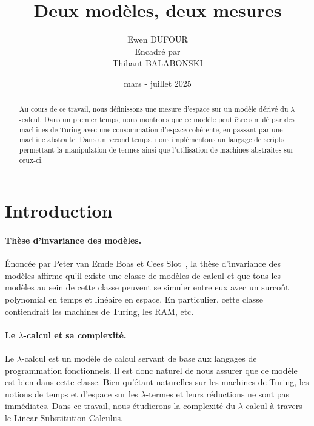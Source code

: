 \documentclass[a4paper, 11pt]{article}
\title{Deux modèles, deux mesures}
\author{Ewen DUFOUR\\[1ex]
{\small Encadré par}\\ {\small Thibaut BALABONSKI}}
\date{mars - juillet 2025}
\theoremstyle{definition}
\begin{document}
\maketitle
\begin{abstract} 
Au cours de ce travail, nous définissons une mesure d’espace sur un modèle dérivé du $\lambda$-calcul.
Dans un premier temps, nous montrons que ce modèle peut être simulé par des machines de Turing avec une consommation d’espace cohérente, en passant par une machine abstraite.
Dans un second temps, nous implémentons un langage de scripts permettant la manipulation de termes ainsi que l’utilisation de machines abstraites sur ceux-ci.
\end{abstract}
\section{Introduction}
\paragraph{Thèse d'invariance des modèles.}
Énoncée par Peter van Emde Boas et Cees Slot~\cite{slot1988problem},
 la thèse d'invariance des modèles affirme qu'il existe une classe de modèles de calcul
 et que tous les modèles au sein de cette classe peuvent se simuler entre eux avec un surcoût polynomial en temps et linéaire en espace. 
 En particulier, cette classe contiendrait les machines de Turing, les RAM, etc.
\paragraph{Le $\lambda$-calcul et sa complexité.}
 Le $\lambda$-calcul est un modèle de calcul servant de base aux langages de programmation fonctionnels.
 Il est donc naturel de nous assurer que ce modèle est bien dans cette classe.
 Bien qu'étant naturelles sur les machines de Turing, les notions de temps et d'espace sur les $\lambda$-termes et leurs réductions ne sont pas immédiates.
 Dans ce travail, nous étudierons la complexité du $\lambda$-calcul à travers le Linear Substitution Calculus.
\end{document}
